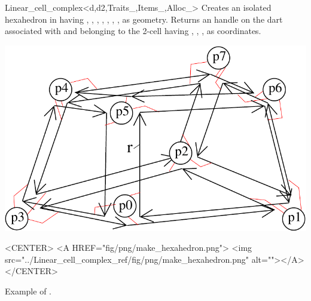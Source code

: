 \begin{ccRefClass}{Linear_cell_complex<d,d2,Traits_,Items_,Alloc_>}
{Creates an isolated hexahedron in  having , ,
, , , , ,  as geometry.
  Returns an handle on the dart associated with  and
  belonging to the 2-cell having , , , 
  as coordinates.
}
\def\LargFig{.4\textwidth}
  \begin{ccTexOnly}
    \begin{center}
      \includegraphics[width=\LargFig]{Linear_cell_complex_ref/fig/pdf/make_hexahedron}
    \end{center}
  \end{ccTexOnly}
  \begin{ccHtmlOnly}
    <CENTER>
    <A HREF="fig/png/make_hexahedron.png">
        <img src="../Linear_cell_complex_ref/fig/png/make_hexahedron.png" alt=""></A>
    </CENTER>
    \end{ccHtmlOnly}
    \centerline{Example of .}

\ccSeeAlso
{}\\
\\
\\
\\
\\
\\

\end{ccRefClass}
\ccRefPageEnd
